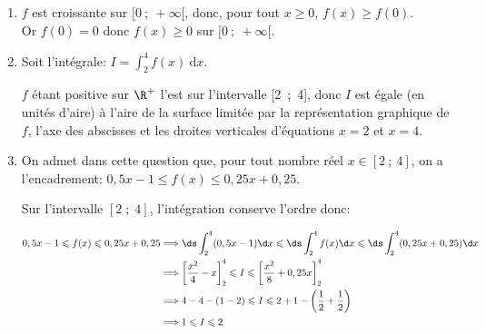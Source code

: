 \begin{enumerate}
\item 
$f$ est croissante sur $[0~;~+ \infty[$, donc, pour tout $x\geqslant 0$, $f(x)\geqslant f(0)$.\\ Or $f(0)=0$ donc  $f(x) \geqslant 0$ sur $[0~;~+\infty[$.

\item Soit l'intégrale:
$I = \displaystyle\int_2^4 f(x)\:\text{d}x.$

$f$ étant positive sur $\R^+$ l'est sur l'intervalle [2~;~4], donc $I$ est égale (en unités d'aire) à l'aire de la surface limitée par la représentation graphique de $f$, l'axe des abscisses et les droites verticales d'équations  $x = 2$ et $x = 4$.

\item On admet dans cette question que, pour tout nombre réel $x \in [2~;~4]$, on a
l'encadrement:
$0,5x - 1 \leqslant f(x) \leqslant 0,25x + 0,25.$




Sur l'intervalle $[2\;;\;4]$, l'intégration conserve l'ordre donc:

$\begin{aligned}
0,5x - 1 \leqslant f(x) \leqslant 0,25x + 0,25
& \Longrightarrow \ds\int_2^4 (0,5x - 1) \d x \leqslant \ds\int_2^4 f(x) \d x \leqslant \ds\int_2^4(0,25x + 0,25) \d x\\
& \Longrightarrow\left[\dfrac{x^2}{4}  - x\right]^4_2 \leqslant I \leqslant \left[\dfrac{x^2}{8} + 0,25x  \right]^4_2\\
& \Longrightarrow 4 - 4 - (1 - 2) \leqslant I \leqslant 2 + 1 - \left(\dfrac12 + \dfrac12\right)\\
& \Longrightarrow 1 \leqslant I \leqslant 2
\end{aligned}$

\end{enumerate}

\bigskip
